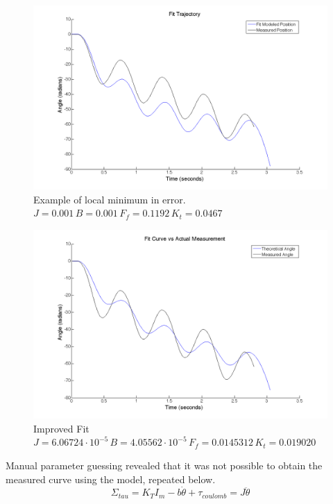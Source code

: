 \documentclass{article}
\theoremstyle{plain}
\theoremstyle{definition}
\theoremstyle{remark}
\begin{document}
\begin{figure}
\begin{center}
\includegraphics[width = 14cm]{fitModel.png}
\caption{Example of local minimum in error.  $J = 0.001 \, B = 0.001 \, F_{f} = 0.1192 \, K_{t} = 0.0467 $}
\label{q2_b6}
\end{center}
\end{figure}

\begin{figure}
\begin{center}
\includegraphics[width = 14cm]{2ndexamplefit.png}
\caption{Improved Fit $J = 6.06724 \cdot 10^{-5} \, B = 4.05562 \cdot 10^{-5} \, F_{f} = 0.0145312 \, K_{t} = 0.019020 $}
\label{q2_b7}
\end{center}
\end{figure}

Manual parameter guessing revealed that it was not possible to obtain the measured curve using the model, repeated below. 
$$ \Sigma_{tau} = K_{T}I_{m} - b\dot{\theta} + \tau_{coulomb} = J \ddot{\theta} $$
\end{document}

